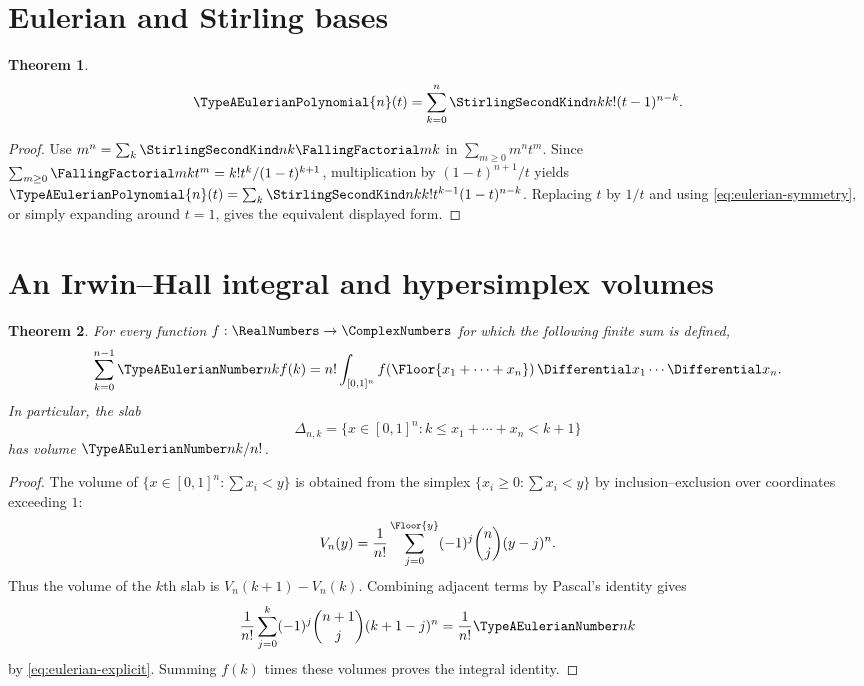 \documentclass[11pt,a4paper,oneside,openany]{book}
\newtheorem{theorem}{Theorem}[chapter]
\theoremstyle{definition}
\theoremstyle{remark}
\begin{document}
\section{Eulerian and Stirling bases}
\begin{theorem}\label{thm:eulerian-stirling}
\begin{equation}\label{eq:eulerian-stirling}
 \TypeAEulerianPolynomial{n}(t)=\sum_{k=0}^{n}\StirlingSecondKind nk k!(t-1)^{n-k}.
\end{equation}
\end{theorem}
\begin{proof}
Use $m^n=\sum_k\StirlingSecondKind nk\FallingFactorial mk$ in
$\sum_{m\ge0}m^nt^m$.  Since
$\sum_{m\ge0}\FallingFactorial mk t^m=k!t^k/(1-t)^{k+1}$, multiplication by
$(1-t)^{n+1}/t$ yields
$\TypeAEulerianPolynomial{n}(t)=\sum_k\StirlingSecondKind nk k!t^{k-1}(1-t)^{n-k}$.  Replacing $t$ by $1/t$ and
using \eqref{eq:eulerian-symmetry}, or simply expanding around $t=1$, gives the
equivalent displayed form.
\end{proof}

\section{An Irwin--Hall integral and hypersimplex volumes}
\begin{theorem}\label{thm:eulerian-irwin-hall}
For every function $f:\RealNumbers\to\ComplexNumbers$ for which the following finite sum is defined,
\begin{equation}\label{eq:eulerian-irwin-hall}
 \sum_{k=0}^{n-1}\TypeAEulerianNumber nk f(k)
 =n!\int_{[0,1]^n}f\!\left(\Floor{x_1+\cdots+x_n}\right)
 \Differential x_1\cdots\Differential x_n.
\end{equation}
In particular, the slab
\[
 \Delta_{n,k}=\{x\in[0,1]^n:k\le x_1+\cdots+x_n<k+1\}
\]
has volume $\TypeAEulerianNumber nk/n!$.
\end{theorem}
\begin{proof}
The volume of $\{x\in[0,1]^n:\sum x_i<y\}$ is obtained from the simplex
$\{x_i\ge0:\sum x_i<y\}$ by inclusion--exclusion over coordinates exceeding $1$:
\[
 V_n(y)=\frac1{n!}\sum_{j=0}^{\Floor{y}}(-1)^j\binom nj(y-j)^n.
\]
Thus the volume of the $k$th slab is $V_n(k+1)-V_n(k)$.  Combining adjacent terms
by Pascal's identity gives
\[
 \frac1{n!}\sum_{j=0}^{k}(-1)^j\binom{n+1}{j}(k+1-j)^n
 =\frac1{n!}\TypeAEulerianNumber nk
\]
by \eqref{eq:eulerian-explicit}.  Summing $f(k)$ times these volumes proves the
integral identity.
\end{proof}
\end{document}
